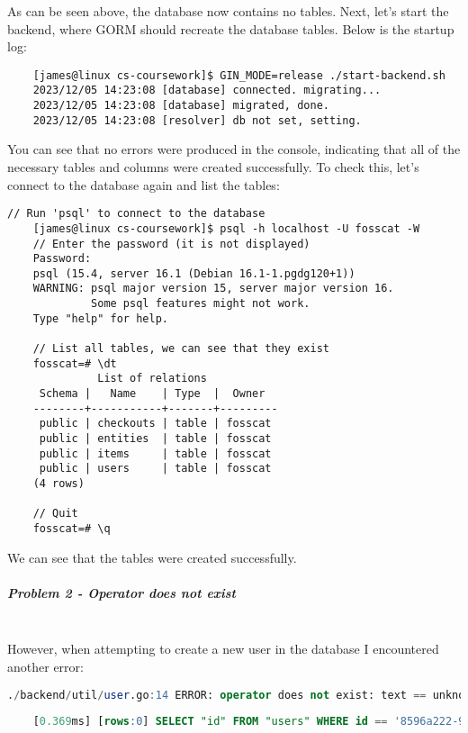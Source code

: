\documentclass[../../main.tex]{subfiles}
\begin{document}
\noindent As can be seen above, the database now contains no tables. Next, let's start the backend, where GORM should recreate the database tables. Below is the startup log:

\begin{lstlisting}
    [james@linux cs-coursework]$ GIN_MODE=release ./start-backend.sh
    2023/12/05 14:23:08 [database] connected. migrating...
    2023/12/05 14:23:08 [database] migrated, done.
    2023/12/05 14:23:08 [resolver] db not set, setting.
    \end{lstlisting}

\noindent You can see that no errors were produced in the console, indicating that all of the necessary tables and columns were created successfully. To check this, let's connect to the database again and list the tables:

\begin{lstlisting}[language=custom_psql_commented]
    // Run 'psql' to connect to the database
    [james@linux cs-coursework]$ psql -h localhost -U fosscat -W
    // Enter the password (it is not displayed)
    Password: 
    psql (15.4, server 16.1 (Debian 16.1-1.pgdg120+1))
    WARNING: psql major version 15, server major version 16.
             Some psql features might not work.
    Type "help" for help.
    
    // List all tables, we can see that they exist
    fosscat=# \dt
              List of relations
     Schema |   Name    | Type  |  Owner  
    --------+-----------+-------+---------
     public | checkouts | table | fosscat
     public | entities  | table | fosscat
     public | items     | table | fosscat
     public | users     | table | fosscat
    (4 rows)
    
    // Quit
    fosscat=# \q
    \end{lstlisting}

\noindent We can see that the tables were created successfully.

\subparagraph{Problem 2 - Operator does not exist}

\noindent \\ However, when attempting to create a new user in the database I encountered another error:

\begin{lstlisting}[language=SQL]
    ./backend/util/user.go:14 ERROR: operator does not exist: text == unknown (SQLSTATE 42883)
    
    [0.369ms] [rows:0] SELECT "id" FROM "users" WHERE id == '8596a222-930e-42f0-841e-9d95993668a4' AND "users"."deleted_at" IS NULL ORDER BY "users"."id" LIMIT 1
    \end{lstlisting}
\end{document}
